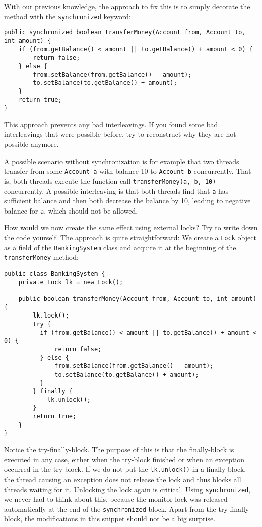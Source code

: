 \documentclass[main.tex]{subfiles}
\begin{document}
With our previous knowledge, the approach to fix this is to simply decorate the method with the \texttt{synchronized} keyword:

\begin{verbatim}
public synchronized boolean transferMoney(Account from, Account to, int amount) {
    if (from.getBalance() < amount || to.getBalance() + amount < 0) {
        return false;
    } else {
        from.setBalance(from.getBalance() - amount);
        to.setBalance(to.getBalance() + amount);
    }
    return true;
}
\end{verbatim}

\noindent This approach prevents any bad interleavings. If you found some bad interleavings that were possible before, try to reconstruct why they are not possible anymore.

A possible scenario without synchronization is for example that two threads transfer from some \texttt{Account a} with balance 10 to \texttt{Account b} concurrently. That is, both threads execute the function call \texttt{transferMoney(a, b, 10)} concurrently. A possible interleaving is that both threads find that \texttt{a} has sufficient balance and then both decrease the balance by 10, leading to negative balance for \texttt{a}, which should not be allowed.

How would we now create the same effect using external locks? Try to write down the code yourself. The approach is quite straightforward: We create a \texttt{Lock} object as a field of the \texttt{BankingSystem} class and acquire it at the beginning of the \texttt{transferMoney} method:

\begin{verbatim}
public class BankingSystem {
    private Lock lk = new Lock();

    public boolean transferMoney(Account from, Account to, int amount) {
        lk.lock();
        try {
          if (from.getBalance() < amount || to.getBalance() + amount < 0) {
              return false;
          } else {
              from.setBalance(from.getBalance() - amount);
              to.setBalance(to.getBalance() + amount);
          }
        } finally {
            lk.unlock();
        }
        return true;
    }
}
\end{verbatim}

\noindent Notice the try-finally-block. The purpose of this is that the finally-block is executed in any case, either when the try-block finished or when an exception occurred in the try-block. If we do not put the \texttt{lk.unlock()} in a finally-block, the thread causing an exception does not release the lock and thus blocks all threads waiting for it. Unlocking the lock again is critical. Using \texttt{synchronized}, we never had to think about this, because the monitor lock was released automatically at the end of the \texttt{synchronized} block. Apart from the try-finally-block, the  modifications in this snippet should not be a big surprise.
\end{document}
